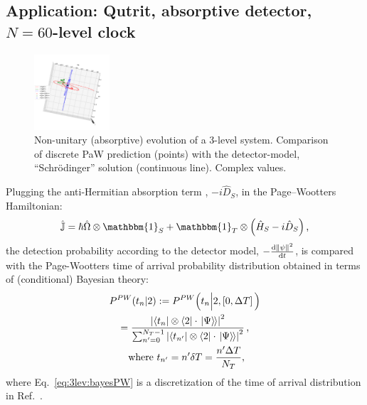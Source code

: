 \documentclass[a0,portrait]{a0poster}
\newcommand{\idop}{\mathbbm{1}}           %
\newcommand{\ox}{\otimes}
\renewcommand{\op}{\hat}                  %
\newcommand{\smallback}{\hspace{-0.115em}}
\newcommand{\dket}[1]{\left.\left| #1 \right\rangle\smallback\right\rangle}
\begin{document}
\begin{multicols}{2}

\section*{Application: Qutrit, absorptive detector, $N=60$-level clock}

\begin{figure}
  \begin{center}
    \includegraphics[width=0.25\textwidth]{3ldetect/PWSpaceTimeFit_top.pdf}
  \end{center}
  \caption{
    \color{Green}
    Non-unitary (absorptive) evolution of a 3-level system.
    Comparison of discrete PaW prediction (points) with the detector-model, ``Schr\"odinger'' solution (continuous line).
    Complex values.
  }
\end{figure}

Plugging the anti-Hermitian absorption term \cite{RuschhauptAbsorption}, $-i \op{D}_S$, in the Page--Wootters Hamiltonian:
\begin{equation*}\label{eq:pwHamiltonian:nonUnitary}
  \op{\mathbb{J}} = \hbar\op{\Omega}\ox\idop_S + \idop_T\ox\qty(\op{H}_S -i \op{D}_S) \,\text{,}
\end{equation*}
the detection probability according to the detector model, $-\dv{\norm{\psi}^2}{t}$, is compared with the Page-Wootters
time of arrival probability distribution obtained in terms of (conditional) Bayesian theory:
\begin{multline}\label{eq:3lev:bayesPW}
  P^{PW}(t_n|2) := P^{PW}\Big( t_n \Big| 2, \left[0,\Delta{T}\right]\Big) \\
  = \frac{
    \abs{\bra{t_n} \ox \bra{2} \cdot \dket{\Psi}}^2
  }{
    \sum_{n'=0}^{N_{T} - 1} \abs{\bra{t_{n'}} \ox \bra{2} \cdot \dket{\Psi}}^2
  }
  \,\text{,}
  \\
  \text{ where } t_{n'} = n'\delta{T} = \frac{n'\Delta{T}}{N_{T}}
  \text{,}
\end{multline}
where Eq.~\eqref{eq:3lev:bayesPW} is a discretization of the time of arrival distribution in Ref.~\cite{Maccone:QMOT}.


\end{multicols}
\end{document}
